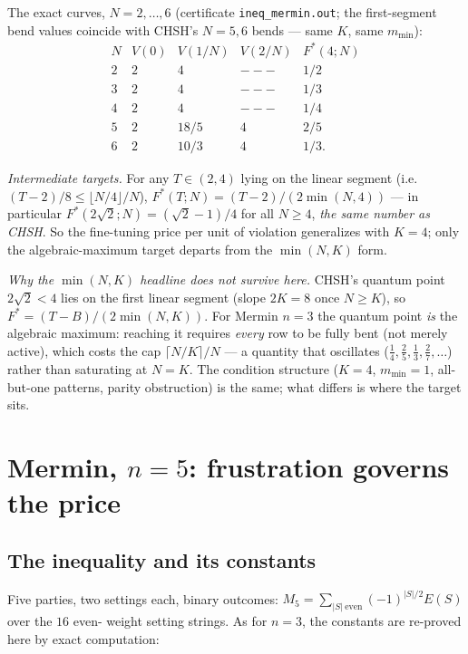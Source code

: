 \documentclass[aps,pra,reprint,superscriptaddress,floatfix]{revtex4-2}
\begin{document}
The exact curves, $N=2,\dots,6$ (certificate \texttt{ineq\_mermin.out};
the first-segment bend values coincide with {CHSH}'s $N=5,6$ bends ---
same $K$, same $m_{\min}$):
\begin{equation*}
\begin{array}{c|cccc}
N & V(0) & V(1/N) & V(2/N) & F^{*}(4;N)\\
\hline
2 & 2 & 4 & --- & 1/2\\
3 & 2 & 4 & --- & 1/3\\
4 & 2 & 4 & --- & 1/4\\
5 & 2 & 18/5 & 4 & 2/5\\
6 & 2 & 10/3 & 4 & 1/3.
\end{array}
\end{equation*}

\emph{Intermediate targets.} For any $T\in(2,4)$ lying on the linear
segment (i.e.\ $(T-2)/8\le \lfloor N/4\rfloor/N$),
$F^{*}(T;N)=(T-2)/(2\min(N,4))$ --- in particular
$F^{*}(2\sqrt{2};N)=(\sqrt{2}-1)/4$ for all $N\ge 4$, \emph{the same
number as {CHSH}}. So the fine-tuning price per unit of violation
generalizes with $K=4$; only the algebraic-maximum target departs from the
$\min(N,K)$ form.

\emph{Why the $\min(N,K)$ headline does not survive here.} {CHSH}'s
quantum point $2\sqrt{2}<4$ lies on the first linear segment (slope
$2K=8$ once $N\ge K$), so $F^{*}=(T-B)/(2\min(N,K))$. For {Mermin} $n=3$
the quantum point \emph{is} the algebraic maximum: reaching it requires
\emph{every} row to be fully bent (not merely active), which costs the cap
$\lceil N/K\rceil/N$ --- a quantity that oscillates
($\tfrac14,\tfrac25,\tfrac13,\tfrac27,\dots$) rather than saturating at
$N=K$. The condition structure ($K=4$, $m_{\min}=1$, all-but-one
patterns, parity obstruction) is the same; what differs is where the
target sits.

\section{{Mermin}, $n=5$: frustration governs the price}
\label{sec:mermin5}

\subsection{The inequality and its constants}

Five parties, two settings each, binary outcomes:
$M_{5}=\sum_{|S|\ \mathrm{even}}(-1)^{|S|/2}E(S)$ over the $16$ even-
weight setting strings. As for $n=3$, the constants are re-proved here by
exact computation:
\end{document}
